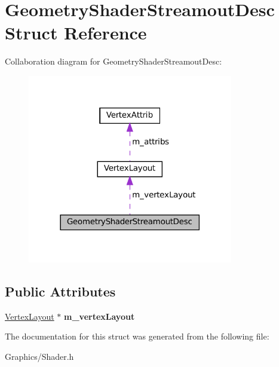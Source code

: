 \hypertarget{structGeometryShaderStreamoutDesc}{}\section{Geometry\+Shader\+Streamout\+Desc Struct Reference}
\label{structGeometryShaderStreamoutDesc}


Collaboration diagram for Geometry\+Shader\+Streamout\+Desc\+:
\nopagebreak
\begin{figure}[H]
\begin{center}
\leavevmode
\includegraphics[width=254pt]{structGeometryShaderStreamoutDesc__coll__graph}
\end{center}
\end{figure}
\subsection*{Public Attributes}
\begin{DoxyCompactItemize}
\item 
\mbox{\label{structGeometryShaderStreamoutDesc_ad4bbb0c4e157ae6e9c816a7b99544cd2}} 
\hyperlink{structVertexLayout}{Vertex\+Layout} $\ast$ {\bfseries m\+\_\+vertex\+Layout}
\end{DoxyCompactItemize}


The documentation for this struct was generated from the following file\+:\begin{DoxyCompactItemize}
\item 
Graphics/Shader.\+h\end{DoxyCompactItemize}
